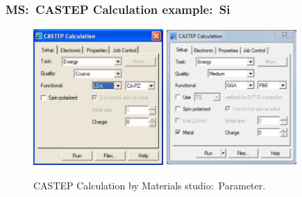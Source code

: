 \frame
{
	\frametitle{\textrm{MS:~CASTEP Calculation example:~Si}}
\begin{figure}[h!]
\centering
\includegraphics[height=2.05in,width=1.95in,viewport=0 0 756 787,clip]{Figures/MS-CASTEP-02-Si-parameter-1.png}
\includegraphics[height=2.05in,width=1.95in,viewport=0 0 775 798,clip]{Figures/MS-CASTEP-02-Si-parameter-2.png}
\caption{\tiny \textrm{CASTEP Calculation by Materials studio:~Parameter.}}%
\label{MS-CASTEP-Calculation-02}
\end{figure}
}

